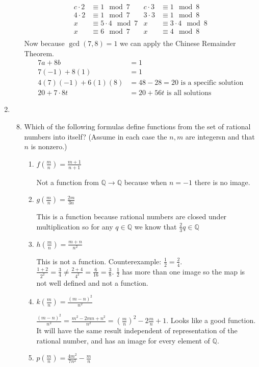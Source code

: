 \documentclass[letterpaper]{article}
\begin{document}
\begin{enumerate}
\begin{enumerate}
\begin{align*}
  c\cdot2&\equiv1\mod 7&c\cdot3&\equiv1\mod8\\
  4\cdot2&\equiv1\mod 7&3\cdot3&\equiv1\mod8\\
  x&\equiv5\cdot4\mod7&x&\equiv3\cdot4\mod8\\
  x&\equiv6\mod7&x&\equiv4\mod8\\
\end{align*}
Now because $\gcd(7,8)=1$ we can apply the Chinese Remainder Theorem.
\begin{align*}
  7a+8b&=1\\
  7(-1)+8(1)&=1\\
  4(7)(-1)+6(1)(8)&=48-28=20\text{ is a specific solution}\\
  20+7\cdot8t&=20+56t\text{ is all solutions}
\end{align*}
\end{enumerate}
\renewcommand{\labelenumi}{2.\arabic{enumi}}
\setcounter{enumi}{0}
\item
\begin{enumerate}
\setcounter{enumii}{7}
\item
Which of the following formulas define functions from the set of rational numbers into itself? (Assume in each case the $n,m$ are integersn and that $n$ is nonzero.)
\begin{enumerate}
\item
$\displaystyle f\left(\frac{m}{n}\right)=\frac{m+1}{n+1}$

Not a function from $\mathbb{Q}\to\mathbb{Q}$ because when $n=-1$ there is no image.
\item
$\displaystyle g\left(\frac{m}{n}\right)=\frac{2m}{3n}$

This is a function because rational numbers are closed under multiplication so for any $q\in\mathbb{Q}$ we know that $\frac{2}{3}q\in\mathbb{Q}$
\item
$\displaystyle h\left(\frac{m}{n}\right)=\frac{m+n}{n^2}$

This is not a function. Counterexample: $\frac{1}{2}=\frac{2}{4}$. $\frac{1+2}{2^2}=\frac{3}{4}\ne\frac{2+4}{4^2}=\frac{6}{16}=\frac{3}{8}$. $\frac{1}{2}$ has more than one image so the map is not well defined and not a function.
\item
$\displaystyle k\left(\frac{m}{n}\right)=\frac{(m-n)^2}{n^2}$

$\displaystyle \frac{(m-n)^2}{n^2}=\frac{m^2-2mn+n^2}{n^2}=\left(\frac{m}{n}\right)^2-2\frac{m}{n}+1$. Looks like a good function. It will have the same result independent of representation of the rational number, and has an image for every element of $\mathbb{Q}$.
\item
$\displaystyle p\left(\frac{m}{n}\right)=\frac{4m^2}{7n^2}-\frac{m}{n}$


\end{enumerate}
\end{enumerate}
\end{enumerate}
\end{document}
